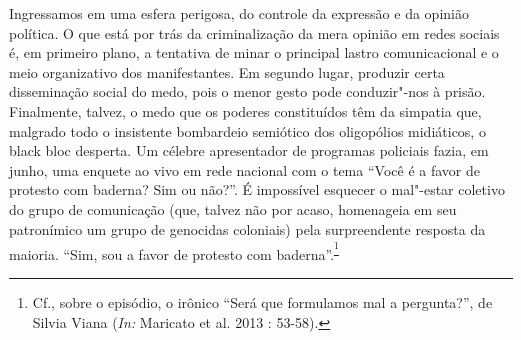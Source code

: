 Ingressamos em uma esfera perigosa, do controle da expressão e da
opinião política. O que está por trás da criminalização da mera opinião
em redes sociais é, em primeiro plano, a tentativa de minar o principal
lastro comunicacional e o meio organizativo dos manifestantes. Em
segundo lugar, produzir certa disseminação social do medo, pois o menor
gesto pode conduzir"-nos à prisão. Finalmente, talvez, o medo que os
poderes constituídos têm da simpatia que, malgrado todo o insistente
bombardeio semiótico dos oligopólios midiáticos, o black bloc desperta.
Um célebre apresentador de programas policiais fazia, em junho, uma
enquete ao vivo em rede nacional com o tema ``Você é a favor de protesto
com baderna? Sim ou não?''. É impossível esquecer o mal"-estar coletivo
do grupo de comunicação (que, talvez não por acaso, homenageia em seu
patronímico um grupo de genocidas coloniais) pela surpreendente resposta
da maioria. ``Sim, sou a favor de protesto com
baderna''.\textsuperscript{\footnote{Cf., sobre o episódio, o irônico
  ``Será que formulamos mal a pergunta?'', de Silvia Viana (\emph{In:}
  Maricato et al. 2013 : 53-58).}}

